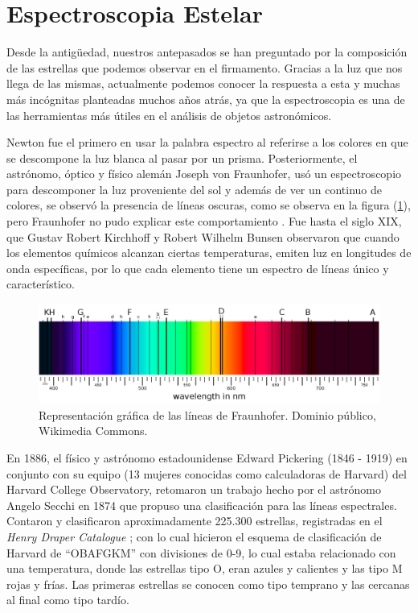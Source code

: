 \documentclass[12pt,oneside,openany,letter]{book}
\begin{document}
\section{Espectroscopia Estelar}\label{espectroscopia}


\noindent Desde la antigüedad, nuestros antepasados se han preguntado por la composición de las estrellas que podemos observar en el firmamento. Gracias a la luz que nos llega de las mismas, actualmente podemos conocer la respuesta a esta y muchas más incógnitas planteadas muchos años atrás, ya que la espectroscopia es una de las herramientas más útiles en el análisis de objetos astronómicos.
\vspace{2mm}

\noindent Newton fue el primero en usar la palabra espectro al referirse a los colores en que se descompone la luz blanca al pasar por un prisma. Posteriormente, el astrónomo, óptico y físico alemán Joseph von Fraunhofer, usó un espectroscopio para descomponer la luz proveniente del sol y además de ver un continuo de colores, se observó la presencia de líneas oscuras, como se observa en la figura (\ref{espectro_frauhofer}), pero Fraunhofer no pudo explicar este comportamiento \citep{von1823denkschriften}. Fue hasta el siglo XIX, que Gustav Robert Kirchhoff y Robert Wilhelm Bunsen observaron que cuando los elementos químicos alcanzan ciertas temperaturas, emiten luz en longitudes de onda específicas, por lo que cada elemento tiene un espectro de líneas único y característico.

\begin{figure}[h]
    \centering
    \includegraphics[width=1\linewidth]{Images/espectro_fraunhofer.png}
    \caption{Representación gráfica de las líneas de Fraunhofer. Dominio público, Wikimedia Commons.}
    \label{espectro_frauhofer}
\end{figure}

\noindent En 1886, el físico y astrónomo estadounidense Edward Pickering (1846 - 1919) en conjunto con su equipo (13 mujeres conocidas como calculadoras de Harvard) del Harvard College Observatory, retomaron un trabajo hecho por el astrónomo Angelo Secchi en 1874 que propuso una clasificación para las líneas espectrales. Contaron y clasificaron aproximadamente 225.300 estrellas, registradas en el \textit{Henry Draper Catalogue} \citep{gray2009stellar}; con lo cual hicieron el esquema de clasificación de Harvard de ``OBAFGKM'' con divisiones de 0-9, lo cual estaba relacionado con una temperatura, donde las estrellas tipo O, eran azules y calientes y las tipo M rojas y frías. Las primeras estrellas se conocen como tipo temprano y las cercanas al final como tipo tardío.
\vspace{2mm}
\end{document}
